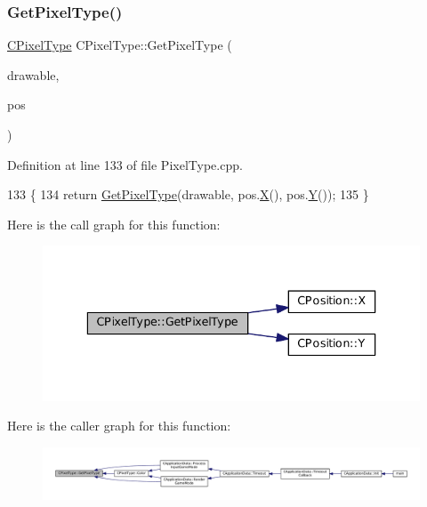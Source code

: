 \subsubsection{\texorpdfstring{Get\+Pixel\+Type()}{GetPixelType()}\hspace{0.1cm}{\footnotesize\ttfamily [1/2]}}
{\footnotesize\ttfamily \hyperlink{classCPixelType}{C\+Pixel\+Type} C\+Pixel\+Type\+::\+Get\+Pixel\+Type (\begin{DoxyParamCaption}\item[{Gdk\+Drawable $\ast$}]{drawable,  }\item[{const \hyperlink{classCPosition}{C\+Position} \&}]{pos }\end{DoxyParamCaption})\hspace{0.3cm}{\ttfamily [static]}}



Definition at line 133 of file Pixel\+Type.\+cpp.


\begin{DoxyCode}
133                                                                               \{
134     \textcolor{keywordflow}{return} \hyperlink{classCPixelType_af38a22feec4bef33deeb628b0877d464}{GetPixelType}(drawable, pos.\hyperlink{classCPosition_a9a6b94d3b91df1492d166d9964c865fc}{X}(), pos.\hyperlink{classCPosition_a1aa8a30e2f08dda1f797736ba8c13a87}{Y}());
135 \}
\end{DoxyCode}
Here is the call graph for this function\+:
\nopagebreak
\begin{figure}[H]
\begin{center}
\leavevmode
\includegraphics[width=336pt]{classCPixelType_af38a22feec4bef33deeb628b0877d464_cgraph}
\end{center}
\end{figure}
Here is the caller graph for this function\+:
\nopagebreak
\begin{figure}[H]
\begin{center}
\leavevmode
\includegraphics[width=350pt]{classCPixelType_af38a22feec4bef33deeb628b0877d464_icgraph}
\end{center}
\end{figure}
\hypertarget{classCPixelType_a91ab76ebf6c87934a8738018686746d4}{}\label{classCPixelType_a91ab76ebf6c87934a8738018686746d4} 
